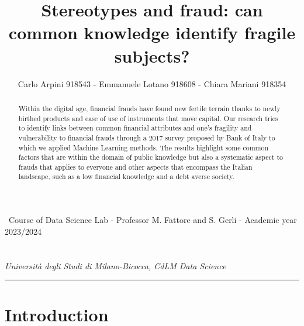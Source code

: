 \documentclass[a4paper,11pt]{article}
\title{\textbf{Stereotypes and fraud: can common knowledge identify fragile subjects?}}
\author{Carlo Arpini 918543 - Emmanuele Lotano 918608 - Chiara Mariani 918354}
\date{}
\begin{document}
\sloppy

\begin{center}
    \small \
    Course of Data Science Lab - Professor M. Fattore and S. Gerli - Academic year 2023/2024  \\
    \vspace{0.5cm}
    \huge
    \thetitle \\
    \vspace{0.5cm}
    \large
    \theauthor \\
    \vspace{0.4cm}
    \small \textit{Università degli Studi di Milano-Bicocca, CdLM Data Science}
    
\end{center}

\vspace{0.8cm}
\hrule
\vspace{0.8cm}

\begin{abstract}
\begin{tcolorbox}[
    width=14cm,
    height=3.72cm,
    colback=boxcolor,
    colframe=white,
    arc=5pt,
    outer arc=5pt,
    left=0pt,
    right=0pt,
    top=0pt,
    bottom=0pt,
    boxsep=5pt
]

  Within the digital age, financial frauds have found new fertile terrain thanks to newly birthed products and ease of use of instruments that move capital. Our research tries to identify links between common financial attributes and one's fragility and vulnerability to financial frauds through a 2017 survey proposed by Bank of Italy to which we applied Machine Learning methods. The results highlight some common factors that are within the domain of public knowledge but also a systematic aspect to frauds that applies to everyone and other aspects that encompass the Italian landscape, such as a low financial knowledge and a debt averse society. 

\end{tcolorbox}
\end{abstract}


\tableofcontents

\newpage
\section{Introduction}
\end{document}
